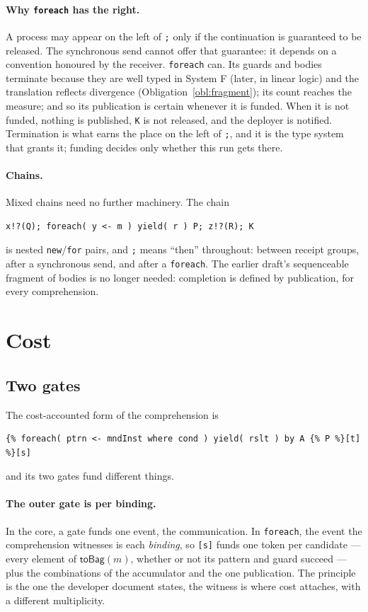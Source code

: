 \documentclass[11pt]{article}
\theoremstyle{definition}
\theoremstyle{plain}
\theoremstyle{remark}
\newcommand{\fe}{\texttt{foreach}}
\begin{document}
\paragraph{Why \fe{} has the right.} A process may appear on the left of
\texttt{;} only if the continuation is guaranteed to be released. The
synchronous send cannot offer that guarantee: it depends on a convention
honoured by the receiver. \fe{} can. Its guards and bodies terminate because
they are well typed in System F (later, in linear logic) and the translation
reflects divergence (Obligation~\ref{obl:fragment}); its count reaches the
measure; and so its publication is certain whenever it is funded. When it is
not funded, nothing is published, \texttt{K} is not released, and the deployer
is notified. Termination is what earns the place on the left of \texttt{;}, and
it is the type system that grants it; funding decides only whether this run
gets there.

\paragraph{Chains.} Mixed chains need no further machinery. The chain
\begin{lstlisting}
x!?(Q); foreach( y <- m ) yield( r ) P; z!?(R); K
\end{lstlisting}
is nested \texttt{new}/\texttt{for} pairs, and \texttt{;} means ``then''
throughout: between receipt groups, after a synchronous send, and after a
\fe{}. The earlier draft's sequenceable fragment of bodies is no longer needed:
completion is defined by publication, for every comprehension.

\section{Cost}
\label{sec:cost}

\subsection{Two gates}

The cost-accounted form of the comprehension is
\begin{lstlisting}
{% foreach( ptrn <- mndInst where cond ) yield( rslt ) by A {% P %}[t] %}[s]
\end{lstlisting}
and its two gates fund different things.

\paragraph{The outer gate is per binding.} In the core, a gate funds one event,
the communication. In \fe{}, the event the comprehension witnesses is each
\emph{binding}, so \texttt{[s]} funds one token per candidate --- every element
of \(\mathsf{toBag}(m)\), whether or not its pattern and guard succeed --- plus
the combinations of the accumulator and the one publication. The principle is
the one the developer document states, the witness is where cost attaches, with
a different multiplicity.
\end{document}
